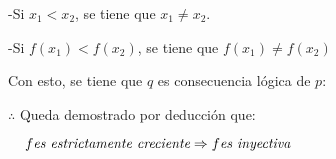 \documentclass[spanish, fleqn]{article}
\begin{document}
\begin{enumerate}
-Si $x_1<x_2$, se tiene que $x_1 \neq x_2$.

-Si $f(x_1)<f(x_2)$, se tiene que $f(x_1) \neq f(x_2)$

Con esto, se tiene que $q$ es consecuencia lógica de $p$:

$\therefore$ Queda demostrado por deducción que:

$\hspace{0.4cm} f \textit{es estrictamente creciente} \Rightarrow f \textit{es inyectiva}$
\end{enumerate}
\end{document}
